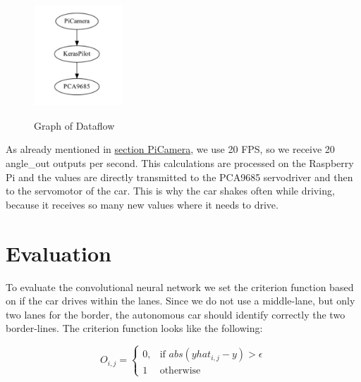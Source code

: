 \documentclass[journal]{IEEEtran}
\begin{document}
\begin{figure}
  \begin{center}
  \includegraphics[width=1.3in]{photo/autonom.png}\\
  \caption{Graph of Dataflow}\label{autonom}
  \end{center}
\end{figure}

As already mentioned in \hyperref[cameramodule]{section PiCamera}, we use 20 FPS, so we receive 20 angle\_out outputs per second. This calculations are processed on the Raspberry Pi and the values are directly transmitted to the PCA9685 servodriver and then to the servomotor of the car. This is why the car shakes often while driving, because it receives so many new values where it needs to drive.


\section{Evaluation}
To evaluate the convolutional neural network we set the criterion function based on if the car drives within the lanes. Since we do not use a middle-lane, but only two lanes for the border, the autonomous car should identify correctly the two border-lines. The criterion function looks like the following:

\[
    O_{i,j}= 
\begin{cases}
    0,& \text{if } abs(yhat_{i,j} - y) > \epsilon\\
    1              & \text{otherwise}
\end{cases}
\]
\end{document}
